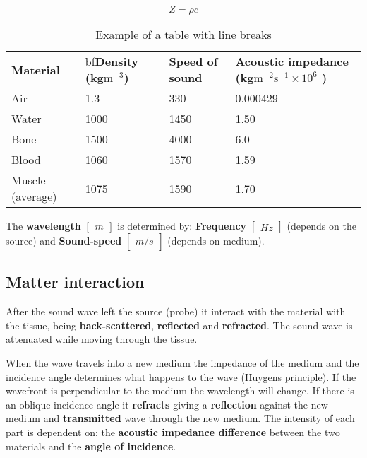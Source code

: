 		\begin{equation}
			Z = \rho c
		\end{equation}

\newpage

		\begin{table}[ht!]
		\centering
		\begin{tabular}{lllm{5cm}}\hline
		\textbf{Material} & bf\textbf{Density (kg$\text{m}^{-3}$)}& \textbf{Speed of sound}& \textbf{Acoustic impedance \newline (kg$\text{m}^{-2}$$\text{s}^{-1} \times 10^6$ )} \\

		Air & 1.3 &  330& 0.000429\\

		Water & 1000 & 1450& 1.50\\

		Bone & 1500 & 4000& 6.0\\
		
		Blood & 1060 & 1570& 1.59\\

		Muscle (average) & 1075 & 1590& 1.70 \\ \hline
		
		\end{tabular}
		\caption{Example of a table with line breaks}
		\label{tab:example}
		\end{table}

	The \textbf{wavelength} $\begin{bmatrix} m \end{bmatrix}$ is determined by: \textbf{Frequency} $\begin{bmatrix} Hz \end{bmatrix}$ (depends on the source) and \textbf{Sound-speed} $\begin{bmatrix} m/s \end{bmatrix}$ (depends on medium). 

	\subsection{Matter interaction}
	After the sound wave left the source (probe) it interact with the material with the tissue, being \textbf{back-scattered}, \textbf{reflected}  and \textbf{refracted}. The sound wave is attenuated while moving through the tissue. 

	When the wave travels into a new medium the impedance of the medium and the incidence angle determines what happens to the wave (Huygens principle). If the wavefront is perpendicular to the medium the wavelength will change. If there is an oblique incidence angle it \textbf{refracts} giving a \textbf{reflection} against the new medium and \textbf{transmitted} wave through the new medium. The intensity of each part is dependent on: the \textbf{acoustic impedance difference} between the two materials and the \textbf{angle of incidence}.

